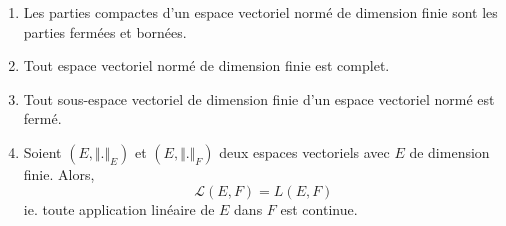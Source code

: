   \begin{corollary}
    \label{autour-de-la-compacite-5}
    \begin{enumerate}[label={\bfseries(\roman*)}]
      \item \label{autour-de-la-compacite-5-1} Les parties compactes d'un espace vectoriel normé de dimension finie sont les parties fermées et bornées.
      \item \label{autour-de-la-compacite-5-2} Tout espace vectoriel normé de dimension finie est complet.
      \item Tout sous-espace vectoriel de dimension finie d'un espace vectoriel normé est fermé.
      \item Soient $(E, \Vert . \Vert_E)$ et $(E, \Vert . \Vert_F)$ deux espaces vectoriels avec $E$ de dimension finie. Alors,
      \[ \mathcal{L}(E, F) = L(E,F) \]
      ie. toute application linéaire de $E$ dans $F$ est continue.
    \end{enumerate}
  \end{corollary}


